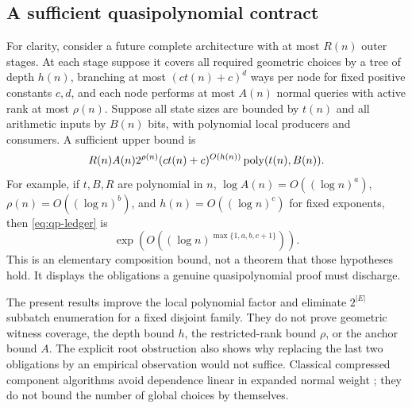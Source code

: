 \subsection{A sufficient quasipolynomial contract}

For clarity, consider a future complete architecture with at most $R(n)$
outer stages. At each stage suppose it covers all required geometric
choices by a tree of depth $h(n)$, branching at most $(ct(n)+c)^d$ ways per
node for fixed positive constants $c,d$, and each node performs at most $A(n)$ normal queries with active
rank at most $\rho(n)$. Suppose all state sizes are bounded by $t(n)$ and
all arithmetic inputs by $B(n)$ bits, with polynomial local producers and
consumers. A sufficient upper bound is
\begin{equation}\label{eq:qp-ledger}
 R(n) A(n) 2^{\rho(n)}
 (ct(n)+c)^{O(h(n))}\operatorname{poly}(t(n),B(n)).
\end{equation}
For example, if $t,B,R$ are polynomial in $n$,
$\log A(n)=O((\log n)^a)$, $\rho(n)=O((\log n)^b)$, and
$h(n)=O((\log n)^c)$ for fixed exponents, then
\eqref{eq:qp-ledger} is
\[
 \exp\!\left(O((\log n)^{\max\{1,a,b,c+1\}})\right).
\]
This is an elementary composition bound, not a theorem that those
hypotheses hold. It displays the obligations a genuine quasipolynomial
proof must discharge.

The present results improve the local polynomial factor and eliminate
$2^{|E|}$ subbatch enumeration for a fixed disjoint family. They do not
prove geometric witness coverage, the depth bound $h$, the restricted-rank
bound $\rho$, or the anchor bound $A$. The explicit root obstruction also
shows why replacing the last two obligations by an empirical observation
would not suffice. Classical compressed component algorithms avoid
dependence linear in expanded normal weight \cite{AHT}; they do not bound
the number of global choices by themselves.

